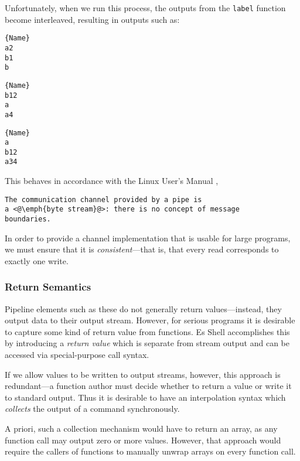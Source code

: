 \documentclass[english,preprint,JIP,uplatex]{ipsj}
\begin{document}
\noindent
Unfortunately, when we run this process, the outputs from the \verb/label/ function become interleaved, resulting in outputs such as:

\noindent\begin{minipage}{.14\textwidth}
\begin{lstlisting}{Name}
a2
b1
b
\end{lstlisting}
\end{minipage}\hfill
\begin{minipage}{.14\textwidth}
\begin{lstlisting}{Name}
b12
a
a4
\end{lstlisting}
\end{minipage}\hfill
\begin{minipage}{.14\textwidth}
\begin{lstlisting}{Name}
a
b12
a34
\end{lstlisting}
\end{minipage}

\noindent
This behaves in accordance with the Linux User's Manual \cite{linux-pipe},
\begin{lstlisting}
The communication channel provided by a pipe is
a <@\emph{byte stream}@>: there is no concept of message
boundaries.
\end{lstlisting}

\noindent
In order to provide a channel implementation that is usable for large programs, we must ensure that it is \emph{consistent}---that is, that every read corresponds to exactly one write.

\subsubsection{Return Semantics}\label{return-semantics}\noindent
Pipeline elements such as these do not generally return values---instead, they output data to their output stream. However, for serious programs it is desirable to capture some kind of return value from functions. Es Shell\cite{haahr} accomplishes this by introducing a \emph{return value} which is separate from stream output and can be accessed via special-purpose call syntax.

If we allow values to be written to output streams, however, this approach is redundant---a function author must decide whether to return a value or write it to standard output. Thus it is desirable to have an interpolation syntax which \emph{collects} the output of a command synchronously.

A priori, such a collection mechanism would have to return an array, as any function call may output zero or more values. However, that approach would require the callers of functions to manually unwrap arrays on every function call.
\end{document}
